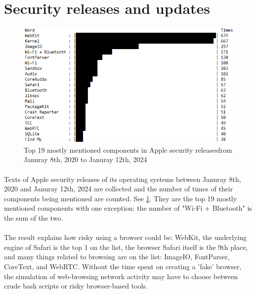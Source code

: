 \documentclass[mscthesis]{usiinfthesis}
\begin{document}
\section{Security releases and updates}
\begin{figure}[H]
  \includegraphics[width=\textwidth]{data/apple_security_releases/result.png}
  \caption{Top 19 mostly mentioned components in Apple security releases\newline from Januray 8th, 2020 to Januray 12th, 2024}
  \label{fig:apple-sec-release}
\end{figure}
\paragraph{}
Texts of Apple security releases of its operating systems between Januray 8th, 2020 and Januray 12th, 2024 are collected and the number of times of their components being mentioned are counted. See \cref{fig:apple-sec-release}. They are the top 19 mostly mentioned components with one exception: the number of "Wi-Fi + Bluetooth" is the sum of the two.
\paragraph{}
The result explains how risky using a browser could be: WebKit, the underlying engine of Safari is the top 1 on the list, the browser Safari itself is the 9th place, and many things related to browsing are on the list: ImageIO, FontParser, CoreText, and WebRTC. Without the time spent on creating a 'fake' browser, the simulation of web-browsing network activity may have to choose between crude bash scripts or risky browser-based tools.
\end{document}
